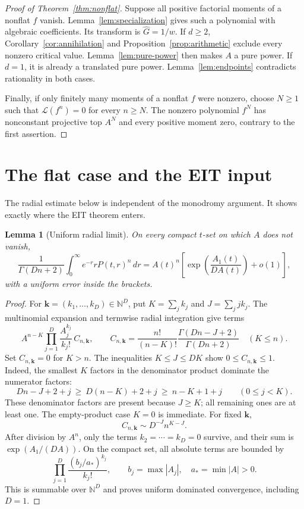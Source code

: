 \documentclass[11pt]{article}
\numberwithin{equation}{section}
\newtheorem{lemma}[theorem]{Lemma}
\theoremstyle{definition}\newtheorem{definition}[theorem]{Definition}
\theoremstyle{remark}\newtheorem{remark}[theorem]{Remark}
\newcommand{\Lfac}{\mathcal L}
\newcommand{\HH}{\widehat G}
\newcommand{\dd}{\,d}
\begin{document}
\begin{proof}[Proof of Theorem~\ref{thm:nonflat}]
Suppose all positive factorial moments of a nonflat $f$ vanish.
Lemma~\ref{lem:specialization} gives such a polynomial with algebraic
coefficients. Its transform is $\HH=1/w$. If $d\ge2$,
Corollary~\ref{cor:annihilation} and Proposition~\ref{prop:arithmetic}
exclude every nonzero critical value. Lemma~\ref{lem:pure-power}
then makes $A$ a pure power. If $d=1$, it is already a translated
pure power. Lemma~\ref{lem:endpoints} contradicts rationality in
both cases.

Finally, if only finitely many moments of a nonflat $f$ were nonzero,
choose $N\ge1$ such that $\Lfac(f^n)=0$ for every $n\ge N$.
The nonzero polynomial $f^N$ has nonconstant projective top $A^N$
and every positive moment zero, contrary to the first assertion.
\end{proof}

\section{The flat case and the EIT input}\label{sec:flat}
The radial estimate below is independent of the monodromy argument.
It shows exactly where the EIT theorem enters.

\begin{lemma}[Uniform radial limit]\label{lem:radial-limit}
On every compact $t$-set on which $A$ does not vanish,
\begin{equation}\label{eq:radial-limit}
 \frac1{\Gamma(Dn+2)}\int_0^\infty e^{-r}rP(t,r)^n\dd r
 =A(t)^n\left[\exp\!\left(\frac{A_1(t)}{DA(t)}\right)+o(1)\right],
\end{equation}
with a uniform error inside the brackets.
\end{lemma}
\begin{proof}
For $\mathbf k=(k_1,\ldots,k_D)\in\mathbb N^D$, put
$K=\sum_jk_j$ and $J=\sum_jj k_j$. The multinomial expansion and
termwise radial integration give terms
\[
 A^{n-K}\prod_{j=1}^D\frac{A_j^{k_j}}{k_j!}\,C_{n,\mathbf k},
 \qquad
 C_{n,\mathbf k}=\frac{n!}{(n-K)!}
     \frac{\Gamma(Dn-J+2)}{\Gamma(Dn+2)}\quad(K\le n).
\]
Set $C_{n,\mathbf k}=0$ for $K>n$. The inequalities $K\le J\le DK$
show $0\le C_{n,\mathbf k}\le1$. Indeed, the smallest $K$ factors
in the denominator product dominate the numerator factors:
\[
 Dn-J+2+j\ \ge\ D(n-K)+2+j\ \ge\ n-K+1+j
 \qquad(0\le j<K).
\]
These denominator factors are present because $J\ge K$; all remaining
ones are at least one. The empty-product case $K=0$ is immediate.
For fixed $\mathbf k$,
\[
 C_{n,\mathbf k}\sim D^{-J}n^{K-J}.
\]
After division by $A^n$, only the terms $k_2=\cdots=k_D=0$ survive,
and their sum is $\exp(A_1/(DA))$.
On the compact set, all absolute terms are bounded by
\[
 \prod_{j=1}^D\frac{(b_j/a_*)^{k_j}}{k_j!},
 \qquad b_j=\max|A_j|,\quad a_* =\min|A|>0.
\]
This is summable over $\mathbb N^D$ and proves uniform dominated
convergence, including $D=1$.
\end{proof}
\end{document}
